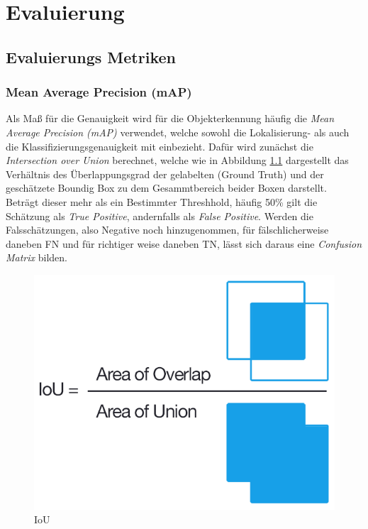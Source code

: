 \chapter{Evaluierung}\label{kap:eval}

\section{Evaluierungs Metriken}\label{sec:metricen}

\subsection*{Mean Average Precision (mAP)}
Als Maß für die Genauigkeit wird für die Objekterkennung häufig 
die \textit{Mean Average Precision (mAP)} verwendet, welche sowohl
die Lokalisierung- als auch die Klassifizierungsgenauigkeit 
mit einbezieht. Dafür wird zunächst die \textit{Intersection over 
Union} berechnet, welche wie in Abbildung \ref{fig:iou} dargestellt das Verhältnis
des Überlappungsgrad der gelabelten (Ground Truth) und der
geschätzete Boundig Box zu dem Gesammtbereich beider Boxen darstellt.
\\
Beträgt dieser mehr als ein Bestimmter Threshhold, häufig 50\%
gilt die Schätzung als \textit{True Positive}, andernfalls als 
\textit{False Positive}. Werden die Falsschätzungen, also Negative 
noch hinzugenommen, für fälschlicherweise daneben FN und für richtiger 
weise daneben TN, lässt sich daraus eine \textit{Confusion Matrix}
bilden.

\begin{figure}[htb]
    \centering
    \label{fig:iou}
    \includegraphics[width=0.25\columnwidth]{Bilder/IoU.png}
    \caption{IoU}
\end{figure}

